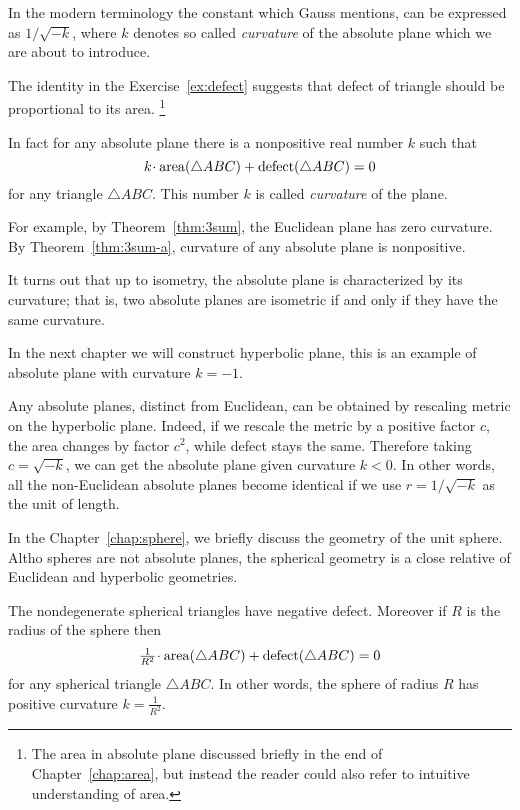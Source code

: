 In the modern terminology the constant which Gauss mentions, 
can be expressed as $1/\sqrt{-k}$, 
where $k$ denotes so called \emph{curvature} of the absolute plane which we are about to introduce.

The identity in the Exercise~\ref{ex:defect}
suggests that defect of triangle 
should be proportional to its area.%
\footnote{The area in absolute plane discussed briefly in the end of Chapter~\ref{chap:area},
but instead the reader could also refer to intuitive understanding of area.}

In fact for any absolute plane there is a nonpositive real number $k$
such that 
$$k\cdot\area(\triangle ABC)+\defect(\triangle ABC)=0$$
for any triangle $\triangle ABC$.
This number $k$ is called \emph{curvature} of the plane.

For example, by Theorem~\ref{thm:3sum}, the Euclidean plane has zero curvature.
By Theorem~\ref{thm:3sum-a}, curvature of any absolute plane is nonpositive.

It turns out that up to isometry, the absolute plane is characterized by its curvature;
that is, two absolute planes are isometric if and only if they have the same curvature. 



In the next chapter we will construct hyperbolic plane,
this is an example of absolute plane with curvature $k=-1$.

Any absolute planes, distinct from Euclidean,
can be obtained by rescaling metric on the hyperbolic plane.
Indeed,
if we rescale the metric by a positive factor $c$,
the area changes by factor $c^2$, 
while defect stays the same.
Therefore taking $c=\sqrt{-k}$,
we can get the absolute plane given curvature $k<0$.
In other words, all the non-Euclidean absolute planes become identical
if we use $r=1/\sqrt{-k}$ as the unit of length.

\medskip

In the Chapter~\ref{chap:sphere},
we briefly discuss the geometry of the unit sphere.
Altho spheres are not absolute planes,
the spherical geometry is a close relative of Euclidean and hyperbolic geometries.

The nondegenerate spherical triangles have negative defect.
Moreover if $R$ is the radius of the sphere then 
$$\tfrac1{R^2}\cdot\area(\triangle ABC)+\defect(\triangle ABC)=0$$
for any spherical triangle $\triangle ABC$.
In other words, 
the sphere of radius $R$ has positive curvature $k=\tfrac1{R^2}$.


